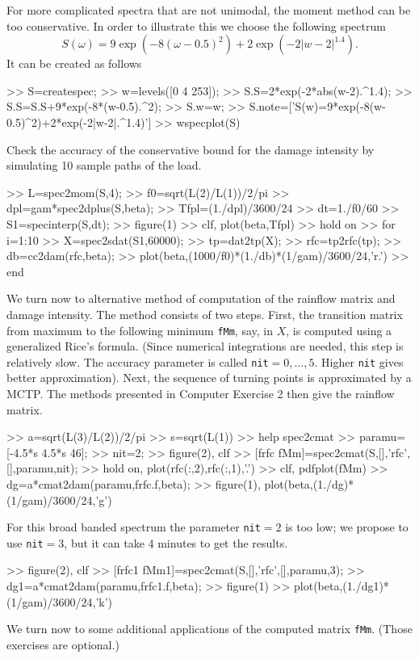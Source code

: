 For more complicated spectra that are not unimodal, the moment method can be
too conservative. In order to illustrate this we choose the following spectrum
$$
S(\omega)=9\exp(-8(\omega-0.5)^2)
+2\exp(-2|w-2|^{1.4}).
$$
It can be created as follows
\begin{code}
>> S=createspec;
>> w=levels([0 4 253]);
>> S.S=2*exp(-2*abs(w-2).^1.4);
>> S.S=S.S+9*exp(-8*(w-0.5).^2);
>> S.w=w;
>> S.note=['S(w)=9*exp(-8(w-0.5)^2)+2*exp(-2|w-2|.^1.4)']
>> wspecplot(S)
\end{code}
Check the accuracy of the conservative bound for the damage intensity
by simulating 10 sample paths of the load.
\begin{code}
>> L=spec2mom(S,4);
>> f0=sqrt(L(2)/L(1))/2/pi
>> dpl=gam*spec2dplus(S,beta);
>> Tfpl=(1./dpl)/3600/24  %
>> dt=1./f0/60
>> S1=specinterp(S,dt);
>> figure(1)
>> clf, plot(beta,Tfpl)
>> hold on
>> for  i=1:10
>>   X=spec2sdat(S1,60000);
>>   tp=dat2tp(X);
>>   rfc=tp2rfc(tp);
>>   db=cc2dam(rfc,beta);
>>   plot(beta,(1000/f0)*(1./db)*(1/gam)/3600/24,'r.') %
>> end
\end{code}
We turn now to alternative method of computation of the rainflow matrix
and damage intensity. The method consists of two steps. First, the
transition matrix from maximum to the following minimum
\verb|fMm|, say, in $X$, is computed using a generalized Rice's formula.
(Since numerical
integrations are needed, this step is relatively slow. The
accuracy parameter is called \verb|nit|$=0,\ldots,5$.
Higher \verb|nit| gives better approximation).
Next, the sequence of turning points is approximated by a MCTP. The methods
presented in Computer Exercise 2 then give the rainflow matrix.
\begin{code}
>> a=sqrt(L(3)/L(2))/2/pi
>> s=sqrt(L(1))
>> help spec2cmat
>> paramu=[-4.5*s 4.5*s 46];
>> nit=2;
>> figure(2), clf
>> [frfc fMm]=spec2cmat(S,[],'rfc',[],paramu,nit);
>> hold on, plot(rfc(:,2),rfc(:,1),'.')
>> clf, pdfplot(fMm)
>> dg=a*cmat2dam(paramu,frfc.f,beta);
>> figure(1), plot(beta,(1./dg)*(1/gam)/3600/24,'g') %
\end{code}
For this broad banded spectrum the parameter \verb|nit|$=2$ is too low;
we propose to use \verb|nit|$=3$, but it can take 4 minutes to get
the results.
\begin{code}
>> figure(2), clf
>> [frfc1 fMm1]=spec2cmat(S,[],'rfc',[],paramu,3);
>> dg1=a*cmat2dam(paramu,frfc1.f,beta);
>> figure(1)
>> plot(beta,(1./dg1)*(1/gam)/3600/24,'k') %
\end{code}
We turn now to some additional applications of the computed matrix
\verb|fMm|. (Those exercises are optional.)

